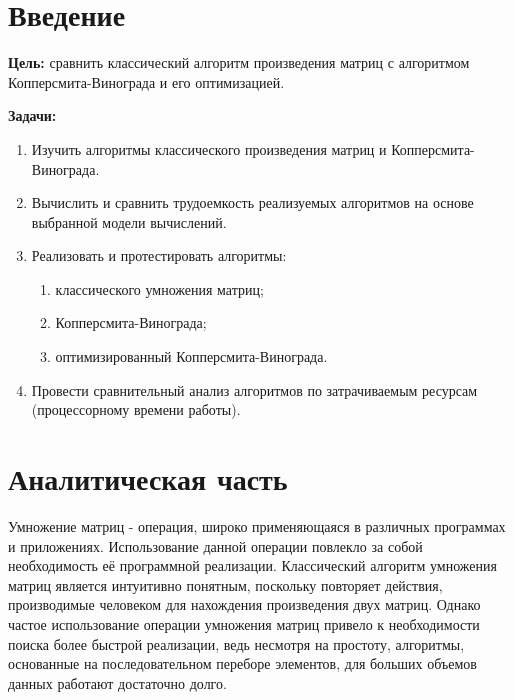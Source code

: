 \documentclass[a4paper,oneside,14pt]{extreport}
\begin{document}

\newpage
\tableofcontents
{}

\newpage

\chapter*{Введение}
\textbf{Цель:} сравнить классический алгоритм произведения матриц с алгоритмом Копперсмита-Винограда и его оптимизацией.

\textbf{Задачи:}
\begin{enumerate}
	\item Изучить алгоритмы классического произведения матриц и Копперсмита-Винограда.
	\item Вычислить и сравнить трудоемкость реализуемых алгоритмов на основе выбранной модели вычислений.
	\item Реализовать и протестировать алгоритмы:
	\begin{enumerate}
		\item классического умножения матриц;
		\item Копперсмита-Винограда;
		\item оптимизированный Копперсмита-Винограда.
	\end{enumerate}
	\item Провести сравнительный анализ алгоритмов по затрачиваемым ресурсам (процессорному времени работы).
\end{enumerate}
\newpage

\chapter{ Аналитическая часть}
Умножение матриц - операция, широко применяющаяся в различных программах и приложениях. Использование данной операции повлекло за собой необходимость её программной реализации. Классический алгоритм умножения матриц является интуитивно понятным, поскольку повторяет действия, производимые человеком для нахождения произведения двух матриц. Однако частое использование операции умножения матриц привело к необходимости поиска более быстрой реализации, ведь несмотря на простоту, алгоритмы, основанные на последовательном переборе элементов, для больших объемов данных работают достаточно долго.
\end{document}
